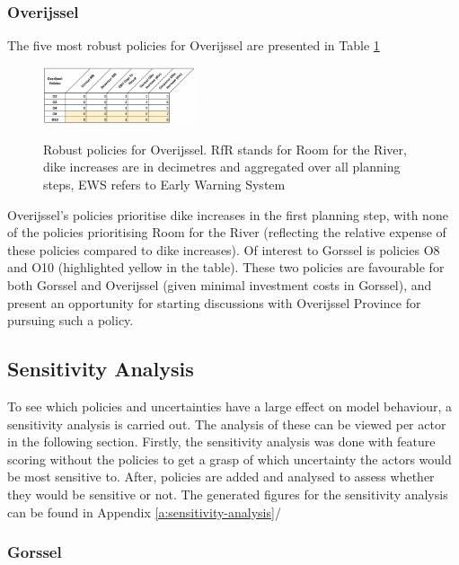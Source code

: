 \subsubsection{Overijssel}
The five most robust policies for Overijssel are presented in Table \ref{fig:opols}

\begin{figure}[h]
    \centering
    \caption{Robust policies for Overijssel. RfR stands for Room for the River, dike increases are in decimetres and aggregated over all planning steps, EWS refers to Early Warning System}
    \includegraphics[width=0.4\textwidth]{report/figures/opols.png}
    \label{fig:opols}
\end{figure}

Overijssel's policies prioritise dike increases in the first planning step, with none of the policies prioritising Room for the River (reflecting the relative expense of these policies compared to dike increases). Of interest to Gorssel is policies O8 and O10 (highlighted yellow in the table). These two policies are favourable for both Gorssel and Overijssel (given minimal investment costs in Gorssel), and present an opportunity for starting discussions with Overijssel Province for pursuing such a policy.


\subsection{Sensitivity Analysis}

To see which policies and uncertainties have a large effect on model behaviour, a sensitivity analysis is carried out. The analysis of these can be viewed per actor in the following section. Firstly, the sensitivity analysis was done with feature scoring without the policies to get a grasp of which uncertainty the actors would be most sensitive to. After, policies are added and analysed to assess whether they would be sensitive or not. The generated figures for the sensitivity analysis can be found in Appendix \ref{a:sensitivity-analysis}/

\subsubsection{Gorssel}

